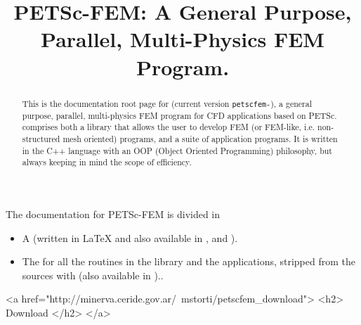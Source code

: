 \documentclass[11pt]{article}
\begin{document}
\sloppy

\title{PETSc-FEM: A General Purpose, Parallel, Multi-Physics FEM Program.}
\maketitle

\begin{abstract}
This is the documentation root page for \pfem (current version 
{\tt petscfem-\petscfemversion}), a general purpose, parallel,
multi-physics FEM program for CFD applications based on
PETSc. \pfem{} comprises both a library that allows the user to
develop FEM (or FEM-like, i.e. non-structured mesh oriented) programs, and
a suite of application programs. It is written in the C++ language
with an OOP (Object Oriented Programming) philosophy, but always
keeping in mind the scope of efficiency. 
\end{abstract}

The documentation for PETSc-FEM is divided in 

\begin{itemize}
\item A 
(written in \LaTeX{} and also available in
, and ).

\item The  for all the routines in the
library and the applications, stripped from the sources with
(also available in )..
\end{itemize}

\begin{rawhtml}
<a href="http://minerva.ceride.gov.ar/~mstorti/petscfem_download"> <h2> Download </h2> </a>
\end{rawhtml}
\end{document}
